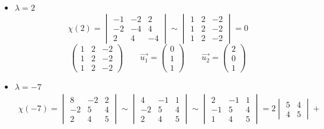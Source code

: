 \begin{itemize}
	\item $ \lambda = 2 $
    $$ \chi(2) =
    \begin{vmatrix}
    	-1 & -2 & 2 \\
        -2 & -4 & 4 \\
        2 & 4 & -4
    \end{vmatrix} \sim
    \begin{vmatrix}
    	1 & 2 & -2 \\
        1 & 2 & -2 \\
        1 & 2 & -2
    \end{vmatrix} = 0 $$
    $$
    \begin{pmatrix}
    	1 & 2 & -2 \\
        1 & 2 & -2 \\
        1 & 2 & -2
    \end{pmatrix} \qquad \vec{u_1} =
    \begin{pmatrix}
    	0 \\
        1 \\
        1
    \end{pmatrix} \qquad \vec{u_2} =
    \begin{pmatrix}
    	2 \\
        0 \\
        1
    \end{pmatrix} $$
    \item $ \lambda = -7 $
    \begin{multline*}
        \chi(-7) =
        \begin{vmatrix}
            8 & -2 & 2 \\
            -2 & 5 & 4 \\
            2 & 4 & 5
        \end{vmatrix} \sim
        \begin{vmatrix}
            4 & -1 & 1 \\
            -2 & 5 & 4 \\
            2 & 4 & 5
        \end{vmatrix} \sim
        \begin{vmatrix}
            2 & -1 & 1 \\
            -1 & 5 & 4 \\
            1 & 4 & 5
        \end{vmatrix} = 2
        \begin{vmatrix}
            5 & 4 \\
            4 & 5
        \end{vmatrix} +

\end{multline*}
\end{itemize}

